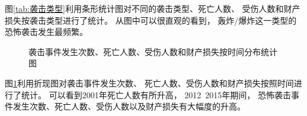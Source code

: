\documentclass[bwprint]{gmcmthesis}
\begin{document}
图\ref{tab:袭击类型}利用条形统计图对不同的袭击类型、死亡人数、
受伤人数和财产损失按袭击类型进行了统计。
从图中可以很直观的看到，
轰炸/爆炸这一类型的恐怖袭击发生最频繁。

\begin{figure}[htbp]
    \caption{袭击事件发生次数、死亡人数、受伤人数和财产损失按时间分布统计图}
    \label{tab:时间分布}
\end{figure}

图\ref{tab:时间分布}利用折现图对袭击事件发生次数、
死亡人数、受伤人数和财产损失按照时间进行了统计。
可以看到2001年死亡人数有所升高，
2012~2015年期间，
恐怖袭击事件发生次数、死亡人数、受伤人数以及财产损失有大幅度的升高。
\end{document}
